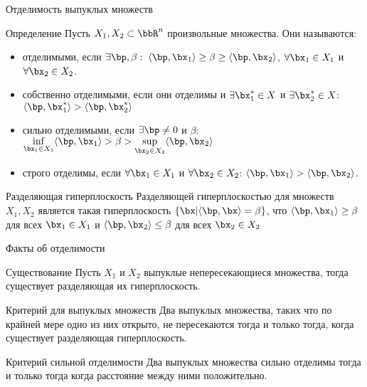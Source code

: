 \documentclass[12pt,russian]{beamer}
\begin{document}
\begin{frame}{Отделимость выпуклых множеств}
\small
\begin{block}{Определение}
Пусть $X_1, X_2 \subset \bbR^n$ произвольные множества. Они называются:
\vspace{-3mm}
\begin{itemize}
\item отделимыми, если $\exists \bp, \beta: \; \langle\bp, \bx_1 \rangle \geq \beta \geq \langle \bp, \bx_2\rangle$, $\forall \bx_1 \in X_1$ и $\forall \bx_2 \in X_2$.
\vspace{-3mm}
\item собственно отделимыми, если они отделимы и $\exists \bx_1^* \in X$ и $\exists \bx_2^* \in X$: $\langle \bp, \bx_1^* \rangle > \langle \bp, \bx_2^* \rangle$
\vspace{-3mm}
\item сильно отделимыми, если $\exists \bp \neq 0$ и $\beta$: $\inf\limits_{\bx_1 \in X_1} \langle \bp, \bx_1 \rangle > \beta > \sup\limits_{\bx_2 \in X_2} \langle \bp, \bx_2 \rangle$
\vspace{-3mm}
\item строго отделимы, если $\forall \bx_1 \in X_1$ и $\forall \bx_2 \in X_2$: $\langle \bp, \bx_1 \rangle > \langle \bp, \bx_2 \rangle$.
\end{itemize} 
\end{block}

\begin{block}{Разделяющая гиперплоскость}
Разделяющей гиперплоскостью для множеств $X_1, X_2$ является такая гиперплоскость $\{ \bx | \langle \bp, \bx \rangle = \beta \}$, что $\langle \bp, \bx_1 \rangle \geq \beta$ для всех $\bx_1 \in X_1$ и $\langle \bp, \bx_2 \rangle \leq \beta$ для всех $\bx_2 \in X_2$   
\end{block}
\end{frame}

\begin{frame}{Факты об отделимости}
\begin{block}{Существование}
Пусть $X_1$ и $X_2$ выпуклые непересекающиеся множества, тогда существует разделяющая их гиперплоскость. 
\end{block}

\begin{block}{Критерий для выпуклых множеств}
Два выпуклых множества, таких что по крайней мере одно из них открыто, не пересекаются тогда и только тогда, когда существует разделяющая гиперплоскость.
\end{block}

\begin{block}{Критерий сильной отделимости}
Два выпуклых множества сильно отделимы тогда и только тогда когда расстояние между ними положительно.
\end{block}

\end{frame}
\end{document}
